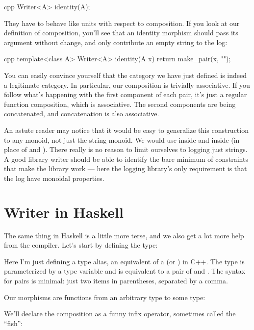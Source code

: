 \begin{snip}{cpp}
Writer<A> identity(A);
\end{snip}
They have to behave like units with respect to composition. If you look
at our definition of composition, you'll see that an identity morphism
should pass its argument without change, and only contribute an empty
string to the log:

\begin{snip}{cpp}
template<class A> Writer<A> identity(A x) {
    return make_pair(x, "");
}
\end{snip}
You can easily convince yourself that the category we have just defined
is indeed a legitimate category. In particular, our composition is
trivially associative. If you follow what's happening with the first
component of each pair, it's just a regular function composition, which
is associative. The second components are being concatenated, and
concatenation is also associative.

An astute reader may notice that it would be easy to generalize this
construction to any monoid, not just the string monoid. We would use
 inside  and  inside
 (in place of \code{+} and ). There really
is no reason to limit ourselves to logging just strings. A good library
writer should be able to identify the bare minimum of constraints that
make the library work --- here the logging library's only requirement is
that the log have monoidal properties.

\section{Writer in Haskell}

The same thing in Haskell is a little more terse, and we also get a lot
more help from the compiler. Let's start by defining the 
type:

Here I'm just defining a type alias, an equivalent of a 
(or ) in C++. The type  is parameterized by
a type variable  and is equivalent to a pair of  and
. The syntax for pairs is minimal: just two items in
parentheses, separated by a comma.

Our morphisms are functions from an arbitrary type to some
 type:

We'll declare the composition as a funny infix operator, sometimes
called the ``fish'':

